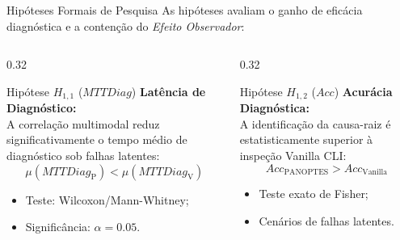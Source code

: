 \documentclass[aspectratio=169, 10pt]{beamer}
\begin{document}
\begin{frame}{Hipóteses Formais de Pesquisa}
  \small
  As hipóteses avaliam o ganho de eficácia diagnóstica e a contenção do \textit{Efeito Observador}:
  \vspace{0.8ex}

  \begin{columns}[T]
    \begin{column}{0.32\textwidth}
      \begin{alertblock}{Hipótese $H_{1,1}$ ($MTTDiag$)}
        \footnotesize
        \textbf{Latência de Diagnóstico:}\\
        A correlação multimodal reduz significativamente o tempo médio de diagnóstico sob falhas latentes:
        \vspace{-1ex}
        \begin{equation*}
          \mu(MTTDiag_{\text{P}}) < \mu(MTTDiag_{\text{V}})
        \end{equation*}
        \vspace{-1.5ex}
        \begin{itemize}
          \item Teste: Wilcoxon/Mann-Whitney;
          \item Significância: $\alpha = 0.05$.
        \end{itemize}
      \end{alertblock}
    \end{column}
    
    \begin{column}{0.32\textwidth}
      \begin{alertblock}{Hipótese $H_{1,2}$ ($Acc$)}
        \footnotesize
        \textbf{Acurácia Diagnóstica:}\\
        A identificação da causa-raiz é estatisticamente superior à inspeção Vanilla CLI:
        \vspace{-1ex}
        \begin{equation*}
          Acc_{\text{PANOPTES}} > Acc_{\text{Vanilla}}
        \end{equation*}
        \vspace{-1.5ex}
        \begin{itemize}
          \item Teste exato de Fisher;
          \item Cenários de falhas latentes.
        \end{itemize}
      \end{alertblock}
    \end{column}
    

\end{columns}
\end{frame}
\end{document}
